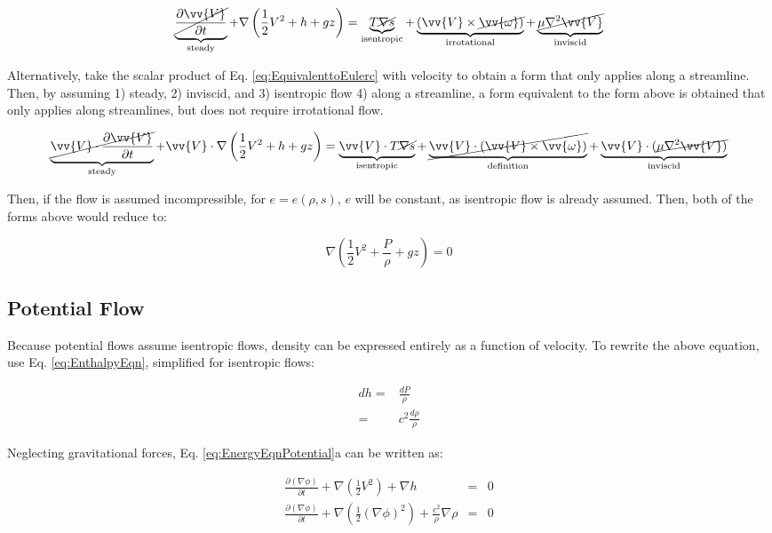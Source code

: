 \documentclass[10pt]{article}
\newcommand{\beq}{\begin{equation}}
\newcommand{\eeq}{\end{equation}}
\newcommand{\beqa}{\begin{equation}\begin{aligned}}
\newcommand{\eeqa}{\end{aligned}\end{equation}}
\begin{document}
\begin{flushleft}
\beq
\label{eq:Bernoulli1}
\underbrace{\cancel{\frac{\partial \vv{V}}{\partial t}}}_{\textrm{steady}}+\nabla\left(\frac{1}{2}V^2+h+gz\right)=\underbrace{T\cancel{\nabla s}}_{\text{isentropic}}+\underbrace{(\vv{V}\times\cancel{\vv{\omega})}}_{\text{irrotational}}+\underbrace{\cancel{\mu\nabla^2\vv{V}}}_{\text{inviscid}}
\eeq

Alternatively, take the scalar product of Eq. \ref{eq:EquivalenttoEulerc} with velocity to obtain a form that only applies along a streamline. Then, by assuming 1) steady, 2) inviscid, and 3) isentropic flow 4) along a streamline, a form equivalent to the form above is obtained that only applies along streamlines, but does not require irrotational flow.

\beq
\label{eq:Bernoulli2}
\underbrace{\cancel{\vv{V}\cdot\frac{\partial \vv{V}}{\partial t}}}_{\text{steady}}+\vv{V}\cdot\nabla\left(\frac{1}{2}V^2+h+gz\right)=\underbrace{\vv{V}\cdot T\cancel{\nabla s}}_{\text{isentropic}}+\underbrace{\cancel{\vv{V}\cdot(\vv{V}\times\vv{\omega})}}_{\text{definition}}+\underbrace{\vv{V}\cdot(\cancel{\mu\nabla^2\vv{V})}}_{\text{inviscid}}
\eeq

Then, if the flow is assumed incompressible, for \(e=e(\rho,s)\), \(e\) will be constant, as isentropic flow is already assumed. Then, both of the forms above would reduce to:

\beq
\label{eq:Bernoulli3}
\nabla\left(\frac{1}{2}V^2+\frac{P}{\rho}+gz\right)=0
\eeq


\subsection{Potential Flow}
Because potential flows assume isentropic flows, density can be expressed entirely as a function of velocity. To rewrite the above equation, use Eq. \eqref{eq:EnthalpyEqn}, simplified for isentropic flows:

\beqa
dh=&\frac{dP}{\rho}\\
=&c^2\frac{d\rho}{\rho}
\eeqa

Neglecting gravitational forces, Eq. \eqref{eq:EnergyEqnPotential}a can be written as:

\begin{subequations}
\label{eq:R1}
\begin{eqnarray}
\frac{\partial (\nabla\phi)}{\partial t}+\nabla \left(\frac{1}{2}V^2\right)+\nabla h&=&0\\
\frac{\partial (\nabla\phi)}{\partial t}+\nabla \left(\frac{1}{2}(\nabla\phi)^2\right)+\frac{c^2}{\rho}\nabla\rho&=&0
\end{eqnarray}
\end{subequations}


\end{flushleft}
\end{document}
